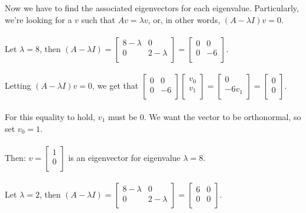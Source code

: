 \documentclass[11pt]{article}
\begin{document}
Now we have to find the associated eigenvectors for each eigenvalue. Particularly, we're looking for a $v$ such that $Av = \lambda v$, or, in other words, $(A - \lambda I)v = 0$. \\\\
Let $\lambda = 8$, then $(A - \lambda I) = \begin{bmatrix}
8 - \lambda & 0 \\
0 & 2 - \lambda \\
\end{bmatrix} = \begin{bmatrix}
0 & 0 \\
0 & -6 \\
\end{bmatrix}$. \\\\
Letting $(A - \lambda I)v = 0$, we get that $ \begin{bmatrix}
0 & 0 \\
0 & -6 \\
\end{bmatrix} \begin{bmatrix}
v_0 \\
v_1 \\
\end{bmatrix} = \begin{bmatrix}
0 \\
-6v_1 \\
\end{bmatrix} = \begin{bmatrix}
0 \\
0 \\
\end{bmatrix} $. \\\\
For this equality to hold, $v_1$ must be 0. We want the vector to be orthonormal, so set $v_0 =1$. \\\\
Then: $v = \begin{bmatrix}
1 \\
0 \\
\end{bmatrix}$ is an eigenvector for eigenvalue $\lambda = 8$. \\\\
Let $\lambda = 2$, then $(A - \lambda I) = \begin{bmatrix}
8 - \lambda & 0 \\
0 & 2 - \lambda \\
\end{bmatrix} = \begin{bmatrix}
6 & 0 \\
0 & 0 \\
\end{bmatrix}$. \\\\
\end{document}
